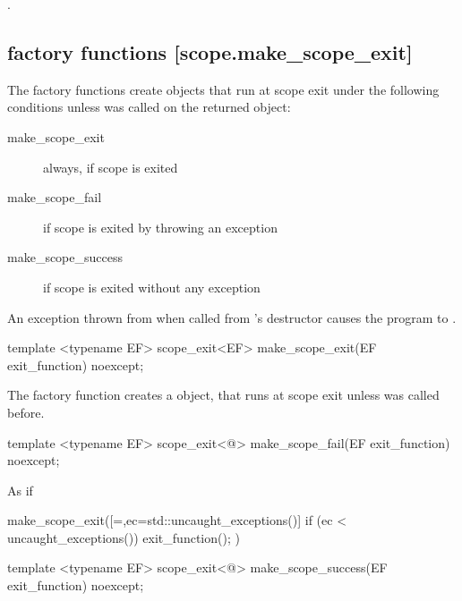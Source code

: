 \documentclass[ebook,11pt,article]{memoir}
\begin{document}
\begin{itemdescr}
\pnum
\effects {}.
\end{itemdescr}


\subsection { factory functions [scope.make_scope_exit]}
\pnum
The factory functions create  objects that run  at scope exit  under the following conditions unless  was called on the returned object:
\begin{description}
\item[make_scope_exit ] always, if scope is exited
\item[make_scope_fail ] if scope is exited by throwing an exception
\item[make_scope_success ] if scope is exited without any exception
\end{description}
\pnum
\enternote
An exception thrown from  when called from 's destructor causes the program to .
\exitnote

\begin{itemdecl}
template <typename EF>
scope_exit<EF> make_scope_exit(EF exit_function) noexcept;
\end{itemdecl}

\begin{itemdescr}
\pnum
The factory function creates a  object, that runs  at scope exit unless  was called before.

\end{itemdescr}

\begin{itemdecl}
template <typename EF>
scope_exit<@\seebelow@> make_scope_fail(EF exit_function) noexcept;
\end{itemdecl}

\begin{itemdescr}
\pnum
\returns As if
\begin{codeblock}
  make_scope_exit([=,ec=std::uncaught_exceptions()]
    {
      if (ec < uncaught_exceptions()) exit_function();
    })
\end{codeblock}
\end{itemdescr}
\begin{itemdecl}
template <typename EF>
scope_exit<@\seebelow@> make_scope_success(EF exit_function) noexcept;
\end{itemdecl}
\end{document}
